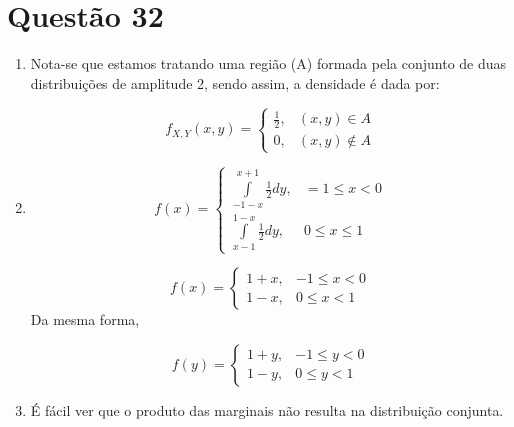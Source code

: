 \documentclass[a4paper,12pt]{report}
\begin{document}
	\section*{Questão 32}
		\begin{enumerate}[label=\alph*)]
				\item 
						
Nota-se que estamos tratando uma região (A) formada pela conjunto de duas distribuições  de amplitude 2, sendo assim, a densidade é dada por:
																		
				$$	f_{X,Y}(x,y) = \begin{cases}
					\frac{1}{2}, &  (x,y)\in A\\
				0, & (x,y)\not\in A
	\end{cases}
				$$
				\item 
					$$f(x) =\begin{cases}
				\int\limits_{-1-x}^{x+1} \frac{1}{2} dy, & =1\le x < 0\\
					\int\limits_{x-1}^{1-x} \frac{1}{2} dy, & 0\le x \le 1
			\end{cases}$$
																		
			$$
				f(x) = \begin{cases}
			1+x, &-1\le x < 0\\
			1-x, & 0\le x < 1
			\end{cases}
			$$
																		Da mesma forma,
																		
																	$$
																	f(y) = \begin{cases}
																	1+y, &-1\le y < 0\\
																	1-y, & 0\le y < 1
																	
																	\end{cases}
																	$$	
																	\item É fácil ver que o produto das marginais não resulta na distribuição conjunta.
		\end{enumerate}
																						
\end{document}
